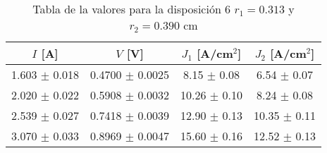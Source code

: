 \begin{table}[H]
    \centering
\begin{tabular}{cccc}
\toprule
$I$ [A] & $V$ [V] & $J_1$ [A/cm$^2$] & $J_2$ [A/cm$^2$] \\
\midrule
1.603 $\pm$ 0.018 & 0.4700 $\pm$ 0.0025 & 8.15 $\pm$ 0.08 & 6.54 $\pm$ 0.07 \\
2.020 $\pm$ 0.022 & 0.5908 $\pm$ 0.0032 & 10.26 $\pm$ 0.10 & 8.24 $\pm$ 0.08 \\
2.539 $\pm$ 0.027 & 0.7418 $\pm$ 0.0039 & 12.90 $\pm$ 0.13 & 10.35 $\pm$ 0.11 \\
3.070 $\pm$ 0.033 & 0.8969 $\pm$ 0.0047 & 15.60 $\pm$ 0.16 & 12.52 $\pm$ 0.13 \\
\bottomrule
\end{tabular}
    \caption{Tabla de la valores para la disposición 6 $r_1=0.313$ y $r_2= 0.390 $ cm }
    \label{Tab:VIJ_6}
\end{table}
